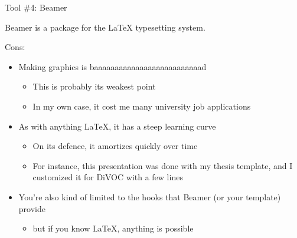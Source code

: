 \documentclass[aspectratio=169]{fireshonks}
\begin{document}
\begin{frame}{Tool \#4: Beamer}
  \begin{center}
    Beamer is a package for the LaTeX typesetting system.
  \end{center}

  Cons:
  \begin{itemize}
    \item Making graphics is baaaaaaaaaaaaaaaaaaaaaaaaaad
          \begin{itemize}
            \item This is probably its weakest point
            \item In my own case, it cost me many university job applications
          \end{itemize}
    \item As with anything LaTeX, it has a steep learning curve
          \begin{itemize}
            \item On its defence, it amortizes quickly over time
            \item For instance, this presentation was done with my thesis template, and I customized it for DiVOC with a few lines
          \end{itemize}
    \item You're also kind of limited to the hooks that Beamer (or your template) provide
          \begin{itemize}
            \item but if you know LaTeX, anything is possible 
          \end{itemize}
  \end{itemize}
\end{frame}
\end{document}

